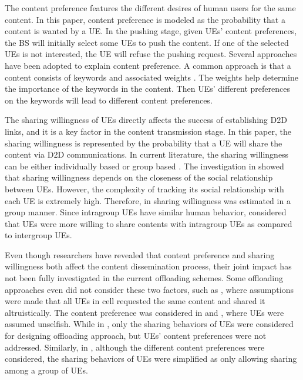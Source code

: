 \documentclass[12pt, draftclsnofoot, onecolumn]{IEEEtran}
\begin{document}
The content preference features the different desires of human users for the same content. In this paper, content preference is modeled as the probability that a content is wanted by a UE. In the pushing stage, given UEs' content preferences, the BS will initially select some UEs to push the content. If one of the selected UEs is not interested, the UE will refuse the pushing request. Several approaches have been adopted to explain content preference\cite{7384466,7244350,li2014multiple,6928487}. A common approach is that a content consists of keywords and associated weights \cite{li2014multiple,6928487}. The weights help determine the importance of the keywords in the content. Then UEs' different preferences on the keywords will lead to different content preferences.

The sharing willingness of UEs directly affects the success of establishing D2D links, and it is a key factor in the content transmission stage. In this paper, the sharing willingness is represented by the probability that a UE will share the content via D2D communications. In current literature, the sharing willingness can be either individually based \cite{zhao2015social,li2016end,wiese2011you} or group based \cite{shaikh2009group,li2011impact}. The investigation in \cite{wiese2011you} showed that sharing willingness depends on the closeness of the social relationship between UEs. However, the complexity of tracking its social relationship with each UE is extremely high. Therefore, in \cite{shaikh2009group} sharing willingness was estimated in a group manner. Since intragroup UEs have similar human behavior, \cite{li2011impact} considered that UEs were more willing to share contents with intragroup UEs as compared to intergroup UEs.

Even though researchers have revealed that content preference and sharing willingness both affect the content dissemination process, their joint impact has not been fully investigated in the current offloading schemes.
Some offloading approaches even did not consider these two factors, such as \cite{al2014optimal, YWuEnergy2016}, where assumptions were made that all UEs in cell requested the same content and shared it altruistically. The content preference was considered in \cite{li2014multiple} and \cite{6928487}, where UEs were assumed unselfish. While in \cite{wang2015social}, only the sharing behaviors of UEs were considered for designing offloading approach, but UEs' content preferences were not addressed. Similarly, in \cite{guo2015cooperative}, although the different content preferences were considered, the sharing behaviors of UEs were simplified as only allowing sharing among a group of UEs.
\end{document}
